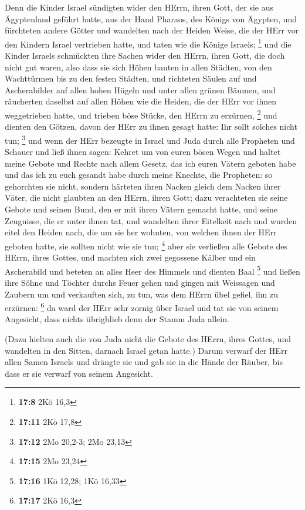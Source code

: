  Denn die Kinder Israel sündigten wider den HErrn, ihren
Gott, der sie aus Ägyptenland geführt hatte, aus der Hand Pharaos, des
Königs von Ägypten, und fürchteten andere Götter  und
wandelten nach der Heiden Weise, die der HErr vor den Kindern Israel
vertrieben hatte, und taten wie die Könige Israels; \footnote{\textbf{17:8}
  2Kö 16,3}  und die Kinder Israels schmückten ihre Sachen
wider den HErrn, ihren Gott, die doch nicht gut waren, also dass sie
sich Höhen bauten in allen Städten, von den Wachttürmen bis zu den
festen Städten,  und richteten Säulen auf und
Ascherabilder auf allen hohen Hügeln und unter allen grünen Bäumen,
 und räucherten daselbst auf allen Höhen wie die Heiden,
die der HErr vor ihnen weggetrieben hatte, und trieben böse Stücke, den
HErrn zu erzürnen, \footnote{\textbf{17:11} 2Kö 17,8} 
und dienten den Götzen, davon der HErr zu ihnen gesagt hatte: Ihr sollt
solches nicht tun; \footnote{\textbf{17:12} 2Mo 20,2-3; 2Mo 23,13}
 und wenn der HErr bezeugte in Israel und Juda durch alle
Propheten und Schauer und ließ ihnen sagen: Kehret um von euren bösen
Wegen und haltet meine Gebote und Rechte nach allem Gesetz, das ich
euren Vätern geboten habe und das ich zu euch gesandt habe durch meine
Knechte, die Propheten:  so gehorchten sie nicht, sondern
härteten ihren Nacken gleich dem Nacken ihrer Väter, die nicht glaubten
an den HErrn, ihren Gott;  dazu verachteten sie seine
Gebote und seinen Bund, den er mit ihren Vätern gemacht hatte, und seine
Zeugnisse, die er unter ihnen tat, und wandelten ihrer Eitelkeit nach
und wurden eitel den Heiden nach, die um sie her wohnten, von welchen
ihnen der HErr geboten hatte, sie sollten nicht wie sie tun; \footnote{\textbf{17:15}
  2Mo 23,24}  aber sie verließen alle Gebote des HErrn,
ihres Gottes, und machten sich zwei gegossene Kälber und ein Ascherabild
und beteten an alles Heer des Himmels und dienten Baal \footnote{\textbf{17:16}
  1Kö 12,28; 1Kö 16,33}  und ließen ihre Söhne und
Töchter durchs Feuer gehen und gingen mit Weissagen und Zaubern um und
verkauften sich, zu tun, was dem HErrn übel gefiel, ihn zu erzürnen:
\footnote{\textbf{17:17} 2Kö 16,3}  da ward der HErr sehr
zornig über Israel und tat sie von seinem Angesicht, dass nichts
übrigblieb denn der Stamm Juda allein.

 (Dazu hielten auch die von Juda nicht die Gebote des
HErrn, ihres Gottes, und wandelten in den Sitten, darnach Israel getan
hatte.)  Darum verwarf der HErr allen Samen Israels und
drängte sie und gab sie in die Hände der Räuber, bis dass er sie verwarf
von seinem Angesicht.

